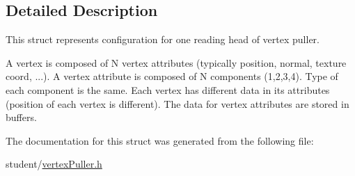 \subsection{Detailed Description}
This struct represents configuration for one reading head of vertex puller. 

A vertex is composed of N vertex attributes (typically position, normal, texture coord, ...). A vertex attribute is composed of N components (1,2,3,4). Type of each component is the same. Each vertex has different data in its attributes (position of each vertex is different). The data for vertex attributes are stored in buffers. 

The documentation for this struct was generated from the following file\-:\begin{DoxyCompactItemize}
\item 
student/\hyperlink{vertexPuller_8h}{vertex\-Puller.\-h}\end{DoxyCompactItemize}

